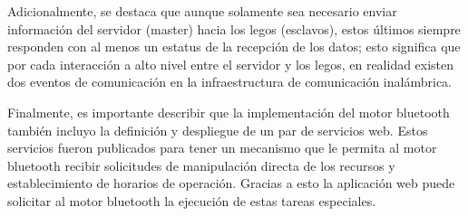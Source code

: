 \documentclass[12pt]{article}
\begin{document}
Adicionalmente, se destaca que aunque solamente sea necesario enviar información del servidor (master) hacia los legos (esclavos), estos últimos siempre responden con al menos un estatus de la recepción de los datos; esto significa que por cada interacción a alto nivel entre el servidor y los legos, en realidad existen dos eventos de comunicación en la infraestructura de comunicación inalámbrica.

Finalmente, es importante describir que la implementación del motor bluetooth también incluyo la definición y despliegue de un par de servicios web. 
Estos servicios fueron publicados para tener un mecanismo que le permita al motor bluetooth recibir solicitudes de manipulación directa de los recursos y establecimiento de horarios de operación.
Gracias a esto la aplicación web puede solicitar al motor bluetooth la ejecución de estas tareas especiales.



\end{document}
